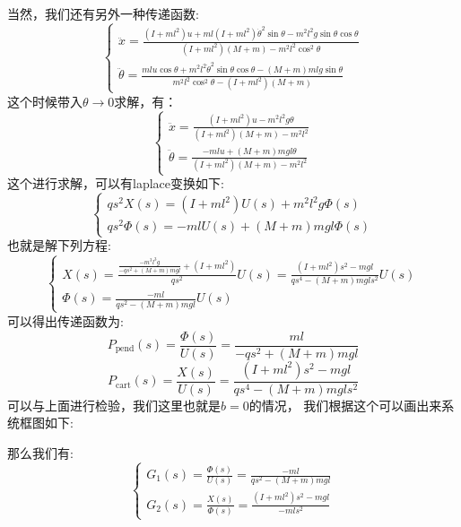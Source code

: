 \documentclass{article}
\begin{document}
当然，我们还有另外一种传递函数:
\[
\left\{
    \begin{matrix}
    \ddot{x}=\frac{(I+ml^2)u+ml(I+ml^2)\dot{\theta}^2\sin\theta-m^2l^2g\sin\theta\cos\theta}{(I+ml^2)(M+m)-m^2l^2\cos^2\theta}\\
    \ddot{\theta}=\frac{mlu\cos\theta+m^2l^2\dot{\theta}^2\sin\theta\cos\theta-(M+m)mlg\sin\theta}{m^2l^2\cos^2\theta-(I+ml^2)(M+m)}
    \end{matrix}
\right.
\]
这个时候带入$\theta\to 0$求解，有：
\[
\left\{
    \begin{matrix}
    \ddot{x}=\frac{(I+ml^2)u-m^2l^2g\theta}{(I+ml^2)(M+m)-m^2l^2}\\
    \ddot{\theta}=\frac{-mlu+(M+m)mgl\theta}{(I+ml^2)(M+m)-m^2l^2}
    \end{matrix}
\right.
\]
这个进行求解，可以有laplace变换如下:
\[
\left\{
\begin{matrix}
    qs^2X(s)=(I+ml^2)U(s)+m^2l^2g\Phi(s)\\
    qs^2\Phi(s)=-mlU(s)+(M+m)mgl\Phi(s)
\end{matrix}
\right.
\]
也就是解下列方程:
\[
\left\{
\begin{matrix}
    X(s)= \frac{\frac{-m^3l^3g}{-qs^2+(M+m)mgl}+(I+ml^2)}{qs^2}U(s)=\frac{(I+ml^2)s^2-mgl}{qs^4 -(M+m)mgls^2}U(s)\\
    \Phi(s)=\frac{-ml}{qs^2-(M+m)mgl}U(s)
\end{matrix}
\right.
\]
可以得出传递函数为:
\[
P_\text{pend}(s)=\frac{\Phi(s)}{U(s)}=\frac{ml}{-qs^2+(M+m)mgl}
\]
\[
P_\text{cart}(s)=\frac{X(s)}{U(s)}=\frac{(I+ml^2)s^2-mgl}{qs^4-(M+m)mgls^2}
\]
可以与上面进行检验，我们这里也就是$b=0$的情况，
我们根据这个可以画出来系统框图如下:
\begin{center}
\end{center}
那么我们有:
\[
\left\{
\begin{matrix}
    G_1(s)=\frac{\Phi(s)}{U(s)}=\frac{-ml}{qs^2-(M+m)mgl}\\
    G_2(s)=\frac{X(s)}{\Phi(s)}=\frac{(I+ml^2)s^2-mgl}{-mls^2}
\end{matrix}
\right.
\]
\end{document}
